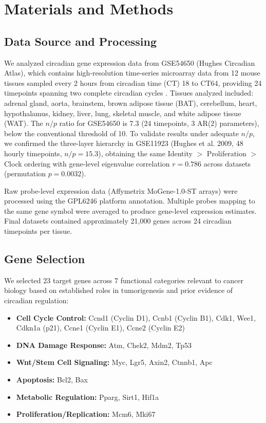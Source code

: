 \documentclass[11pt,letterpaper]{article}
\begin{document}
\section{Materials and Methods}

\subsection{Data Source and Processing}

We analyzed circadian gene expression data from GSE54650 (Hughes Circadian Atlas), which contains high-resolution time-series microarray data from 12 mouse tissues sampled every 2 hours from circadian time (CT) 18 to CT64, providing 24 timepoints spanning two complete circadian cycles \citep{zhang2014}. Tissues analyzed included: adrenal gland, aorta, brainstem, brown adipose tissue (BAT), cerebellum, heart, hypothalamus, kidney, liver, lung, skeletal muscle, and white adipose tissue (WAT). The $n/p$ ratio for GSE54650 is 7.3 (24 timepoints, 3 AR(2) parameters), below the conventional threshold of 10. To validate results under adequate $n/p$, we confirmed the three-layer hierarchy in GSE11923 (Hughes et al. 2009, 48 hourly timepoints, $n/p = 15.3$), obtaining the same Identity $>$ Proliferation $>$ Clock ordering with gene-level eigenvalue correlation $r = 0.786$ across datasets (permutation $p = 0.0032$).

Raw probe-level expression data (Affymetrix MoGene-1.0-ST arrays) were processed using the GPL6246 platform annotation. Multiple probes mapping to the same gene symbol were averaged to produce gene-level expression estimates. Final datasets contained approximately 21,000 genes across 24 circadian timepoints per tissue.

\subsection{Gene Selection}

We selected 23 target genes across 7 functional categories relevant to cancer biology based on established roles in tumorigenesis and prior evidence of circadian regulation:

\begin{itemize}[noitemsep]
    \item \textbf{Cell Cycle Control:} Ccnd1 (Cyclin D1), Ccnb1 (Cyclin B1), Cdk1, Wee1, Cdkn1a (p21), Ccne1 (Cyclin E1), Ccne2 (Cyclin E2)
    \item \textbf{DNA Damage Response:} Atm, Chek2, Mdm2, Tp53
    \item \textbf{Wnt/Stem Cell Signaling:} Myc, Lgr5, Axin2, Ctnnb1, Apc
    \item \textbf{Apoptosis:} Bcl2, Bax
    \item \textbf{Metabolic Regulation:} Pparg, Sirt1, Hif1a
    \item \textbf{Proliferation/Replication:} Mcm6, Mki67
\end{itemize}
\end{document}
